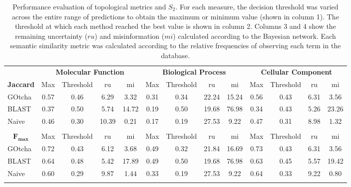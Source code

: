 \begin{table}[t]
\caption[Performance evaluation of topological metrics and $S_{2}$]{Performance evaluation of topological metrics and $S_{2}$. For each measure, the decision threshold was varied across the entire range of predictions to obtain the maximum or minimum value (shown in column 1). The threshold at which each method reached the best value is shown in column 2. Columns 3 and 4 show the remaining uncertainty ($ru$) and misinformation ($mi$) calculated according to the Bayesian network. Each semantic similarity metric was calculated according to the relative frequencies of observing each term in the database. 
\label{tab:rumi1_2}}
\resizebox{\columnwidth}{!}
{\begin{tabular}{c|cccc|cccc|cccc}

\multicolumn{1}{l}{\hphantom} &\multicolumn{4}{c}{\bf Molecular Function } & \multicolumn{4}{c}{\bf Biological Process} &  \multicolumn{4}{c}{\bf Cellular Component } \\

\bf Jaccard & Max & Threshold & ru & mi & Max & Threshold & ru & mi & Max & Threshold & ru & mi\\
\hline
\multicolumn{1}{l|}{GOtcha}& 0.57 & 0.46 & 6.29 & 3.32 & 0.31 & 0.34 & 22.24 & 15.24 & 0.56 & 0.43 & 6.31 & 3.56 \\
\multicolumn{1}{l|}{BLAST}& 0.37 & 0.50 & 5.74 & 14.72 & 0.19 & 0.50 & 19.68 & 76.98 & 0.34 & 0.43 & 5.26 & 23.26 \\
\multicolumn{1}{l|}{Naive}& 0.46 & 0.30 & 10.39 & 0.21 & 0.17 & 0.19 & 27.53 & 9.22 & 0.47 & 0.31 & 8.98 & 1.32 \\


\multicolumn{1}{l}{\hphantom} & & & &\multicolumn{1}{c}{\hphantom} & & & & \multicolumn{1}{c}{\hphantom} & & & &\\

$\mathbf{ F_{max} }$ & Max & Threshold & ru & mi & Max & Threshold & ru & mi & Max & Threshold & ru & mi\\
\hline
\multicolumn{1}{l|}{GOtcha}& 0.72 & 0.43 & 6.12 & 3.68 & 0.49 & 0.32 & 21.84 & 16.69 & 0.73 & 0.43 & 6.31 & 3.56 \\
\multicolumn{1}{l|}{BLAST}& 0.64 & 0.48 & 5.42 & 17.89 & 0.49 & 0.50 & 19.68 & 76.98 & 0.63 & 0.45 & 5.57 & 19.42 \\
\multicolumn{1}{l|}{Naive}& 0.60 & 0.29 & 9.87 & 1.44 & 0.33 & 0.19 & 27.53 & 9.22 & 0.64 & 0.33 & 9.22 & 0.80 \\


\multicolumn{1}{l}{\hphantom} & & & &\multicolumn{1}{c}{\hphantom} & & & & \multicolumn{1}{c}{\hphantom} & & & &\\


\end{tabular}}
\end{table}
